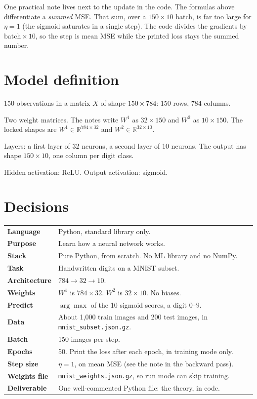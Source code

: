 \documentclass[11pt]{article}
\begin{document}
One practical note lives next to the update in the code. The formulas above differentiate a \emph{summed} MSE. That sum, over a $150\times 10$ batch, is far too large for $\eta=1$ (the sigmoid saturates in a single step). The code divides the gradients by $\text{batch}\times 10$, so the step is mean MSE while the printed loss stays the summed number.

\section*{Model definition}

150 observations in a matrix $X$ of shape $150\times 784$: 150 rows, 784 columns.

Two weight matrices. The notes write $W^{1}$ as $32\times 150$ and $W^{2}$ as $10\times 150$. The locked shapes are $W^{1}\in\mathbb{R}^{784\times 32}$ and $W^{2}\in\mathbb{R}^{32\times 10}$.

Layers: a first layer of 32 neurons, a second layer of 10 neurons. The output has shape $150\times 10$, one column per digit class.

Hidden activation: ReLU. Output activation: sigmoid.

\section*{Decisions}

\begin{center}
\small
\begin{tabular}{@{}>{\sffamily\bfseries}l p{11.4cm}@{}}
\toprule
Language & Python, standard library only. \\
Purpose & Learn how a neural network works. \\
Stack & Pure Python, from scratch. No ML library and no NumPy. \\
Task & Handwritten digits on a MNIST subset. \\
Architecture & $784 \rightarrow 32 \rightarrow 10$. \\
Weights & $W^{1}$ is $784\times 32$. $W^{2}$ is $32\times 10$. No biases. \\
Predict & $\arg\max$ of the 10 sigmoid scores, a digit $0$--$9$. \\
Data & About 1{,}000 train images and 200 test images, in \texttt{mnist\_subset.json.gz}. \\
Batch & 150 images per step. \\
Epochs & 50. Print the loss after each epoch, in training mode only. \\
Step size & $\eta = 1$, on mean MSE (see the note in the backward pass). \\
Weights file & \texttt{mnist\_weights.json.gz}, so run mode can skip training. \\
Deliverable & One well-commented Python file: the theory, in code. \\
\bottomrule
\end{tabular}
\end{center}
\end{document}
